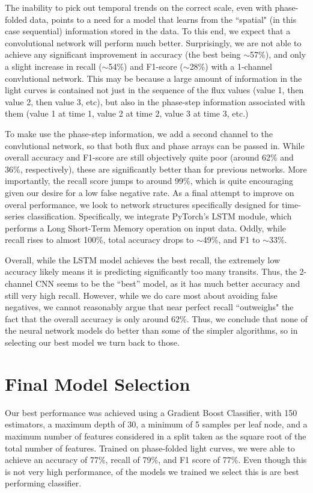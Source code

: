 \documentclass{article}
\begin{document}
The inability to pick out temporal trends on the correct scale, even with phase-folded data, points to a need for a model that learns from the ``spatial" (in this case sequential) information stored in the data. To this end, we expect that a convolutional network will perform much better. Surprisingly, we are not able to achieve any significant improvement in accuracy (the best being $\sim$57\%), and only a slight increase in recall ($\sim$54\%) and F1-score ($\sim$28\%) with a 1-channel convlutional network. This may be because a large amount of information in the light curves is contained not just in the sequence of the flux values (value 1, then value 2, then value 3, etc), but also in the phase-step information associated with them (value 1 at time 1, value 2 at time 2, value 3 at time 3, etc.)  

To make use the phase-step information, we add a second channel to the convlutional network, so that both flux and phase arrays can be passed in. While overall accuracy and F1-score are still objectively quite poor (around 62\% and 36\%, respectively), these are significantly better than for previous networks. More importantly, the recall score jumps to around 99\%, which is quite encouraging given our desire for a low false negative rate. As a final attempt to improve on overal performance, we look to network structures specifically designed for time-series classification. Specifically, we integrate PyTorch's LSTM module, which performs a Long Short-Term Memory operation on input data. Oddly, while recall rises to almost 100\%, total accuracy drops to $\sim$49\%, and F1 to $\sim$33\%.

Overall, while the LSTM model achieves the best recall, the extremely low accuracy likely means it is predicting significantly too many transits. Thus, the 2-channel CNN seems to be the “best” model, as it has much better accuracy and still very high recall. However, while we do care most about avoiding false negatives, we cannot reasonably argue that near perfect recall ``outweighs" the fact that the overall accuracy is only around 62\%. Thus, we conclude that none of the neural network models do better than some of the simpler algorithms, so in selecting our best model we turn back to those.  

\section{Final Model Selection}
Our best performance was achieved using a Gradient Boost Classifier, with 150 estimators, a maximum depth of 30, a minimum of 5 samples per leaf node, and a maximum number of features considered in a split taken as the square root of the total number of features. Trained on phase-folded light curves, we were able to achieve an accuracy of 77\%, recall of 79\%, and F1 score of 77\%. Even though this is not very high performance, of the models we trained we select this is are best performing classifier.
\end{document}
